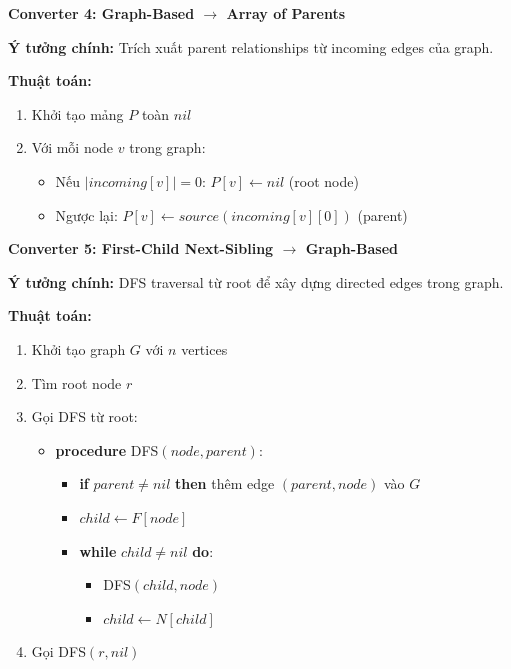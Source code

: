 \documentclass[12pt,a4paper]{article}
\begin{document}
\textbf{Converter 4: Graph-Based $\rightarrow$ Array of Parents}
\vspace{0.5cm}

\textbf{Ý tưởng chính:} Trích xuất parent relationships từ incoming edges của graph.

\textbf{Thuật toán:}
\begin{enumerate}
    \item Khởi tạo mảng $P$ toàn $nil$
    \item Với mỗi node $v$ trong graph:
    \begin{itemize}
        \item Nếu $|incoming[v]| = 0$: $P[v] \leftarrow nil$ (root node)
        \item Ngược lại: $P[v] \leftarrow source(incoming[v][0])$ (parent)
    \end{itemize}
\end{enumerate}


\vspace{0.5cm}

\textbf{Converter 5: First-Child Next-Sibling $\rightarrow$ Graph-Based}
\vspace{0.5cm}

\textbf{Ý tưởng chính:} DFS traversal từ root để xây dựng directed edges trong graph.

\textbf{Thuật toán:}
\begin{enumerate}
    \item Khởi tạo graph $G$ với $n$ vertices
    \item Tìm root node $r$
    \item Gọi DFS từ root:
    \begin{itemize}
        \item \textbf{procedure} DFS$(node, parent)$:
        \begin{itemize}
            \item \textbf{if} $parent \neq nil$ \textbf{then} thêm edge $(parent, node)$ vào $G$
            \item $child \leftarrow F[node]$
            \item \textbf{while} $child \neq nil$ \textbf{do}:
            \begin{itemize}
                \item DFS$(child, node)$
                \item $child \leftarrow N[child]$
            \end{itemize}
        \end{itemize}
    \end{itemize}
    \item Gọi DFS$(r, nil)$
\end{enumerate}
\end{document}
